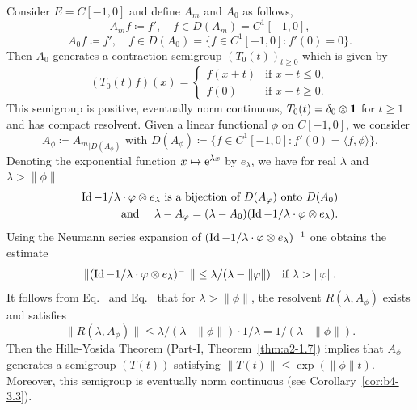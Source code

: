 \begin{example}
\begin{enumerate}[\upshape (i), wide, labelindent=.25em]
	Consider $E = C[-1,0]$ and define $A_{m}$ and $A_{0}$ as follows,
	\begin{equation}\label{eq:b3-2.23}
		A_{m}f \coloneq f', \quad f \in D(A_{m}) = C^{1}[-1,0] , 
	\end{equation}
	\begin{equation}\label{eq:b3-2.24}
		A_{0}f \coloneq f', \quad f \in D(A_{0}) = \{f \in C^{1}[-1,0] \colon f'(0) = 0\}.
	\end{equation}
	Then $A_{0}$ generates a contraction semigroup $(T_{0}(t))_{t \geq 0}$ which is given by
	\begin{equation}\label{eq:b3-2.25}
		(T_{0}(t)f)(x) = \begin{cases}
			f(x+t) & \text{if } x+t \leq 0 ,  \\
			f(0) & \text{if } x+t \geq 0.
		\end{cases}
	\end{equation}
	This semigroup is positive, eventually norm continuous, $T_{0}(t) = \delta_{0}\otimes \mathbf{1}$ for $t \geq 1$ and has compact resolvent.
	Given a linear functional $\phi$ on $C[-1,0]$, we consider
	\begin{equation}\label{eq:b3-2.26}
		A_{\phi} \coloneq {A_{m}}_{|D(A_{\phi})} \text{ with } D(A_{\phi}) \coloneq \{f \in C^{1}[-1,0] \colon f'(0) = \langle f,\phi \rangle\}.
	\end{equation}
	Denoting the exponential function $x \mapsto \mathrm{e}^{\lambda x}$ by $e_{\lambda}$, we have for real $\lambda$ and $\lambda > \|\phi\|$
	 \begin{equation}\label{eq:b3-2.27}
	 \begin{aligned}
		\Id  - 1/\lambda \cdot \phi \otimes e_{\lambda} \text{ is a bijection of } D(A_{\phi}) \text{ onto } D(A_{0})   \\
		\text{ and }\quad \lambda - A_{\phi} = (\lambda - A_{0})(\Id  - 1/\lambda \cdot \phi \otimes e_{\lambda}).
	\end{aligned}
	\end{equation}
	Using the Neumann series expansion of\/ $(\Id  - 1/\lambda \cdot \phi \otimes e_{\lambda})^{-1}$ one obtains the estimate
	\begin{equation}\label{eq:b3-2.28}
		\|(\Id  - 1/\lambda \cdot \phi \otimes e_{\lambda})^{-1}\| \leq \lambda/(\lambda - \|\phi\|) \quad \text{if } \lambda > \|\phi\| .
	\end{equation}
It follows from Eq.~ and Eq.~ that for $\lambda > \|\phi\|$, the resolvent $R(\lambda,A_{\phi})$ exists and satisfies 
\[
\|R(\lambda,A_{\phi})\| \leq \lambda/(\lambda-\|\phi\|)\cdot 1/\lambda = 1/(\lambda-\|\phi\|) .
\]
Then the Hille-Yosida Theorem (Part-I, Theorem~\ref{thm:a2-1.7}) implies that $A_{\phi}$ generates a semigroup $(T(t))$ satisfying $\|T(t)\| \leq \exp(\|\phi\|t)$.
Moreover, this semigroup is eventually norm continuous (see Corollary~\ref{cor:b4-3.3}).


\end{enumerate}
\end{example}
